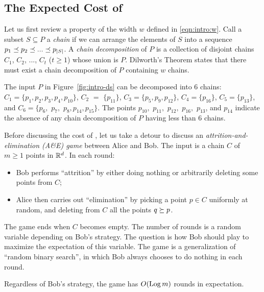 \subsection{The Expected Cost of } \label{sec:rpe:cost}

 Let us first review a property of the width $w$ defined in \eqref{eqn:intro:w}. Call a subset $S \subseteq P$ a {{\em chain}} if we can arrange the elements of $S$ into a sequence $p_1 \preceq p_2 \preceq  ... \preceq p_{|S|}$. A {{\em chain}} {{\em decomposition}} of $P$ is a collection of disjoint chains $C_1$, $C_2$, ..., $C_t$ ($t \ge 1$) whose union is $P$. Dilworth's Theorem \cite{d50} states that there must exist a chain decomposition of $P$ containing $w$ chains.

\vgap

    The input $P$ in Figure~\ref{fig:intro-ds} can be decomposed into 6 chains: $C_1 = \{p_1, p_2, p_3, p_4, p_{10}\}$, $C_2$ $=$ $\{p_{11}\}$, $C_3 = \{p_5, p_9, p_{12}\}$, $C_4 = \{p_{16}\}$, $C_5 = \{p_{13}\}$, and $C_6 = \{p_6,$ $p_7,$ $p_8, p_{14}, p_{15}\}$. The points $p_{10},$ $p_{11},$ $p_{12},$ $p_{16},$ $p_{13}$, and $p_{14}$ indicate the absence of any chain decomposition of $P$ having less than 6 chains.


 Before discussing the cost of , let us take a detour to discuss an {{\em attrition-and-elimination (A\&E) game}} between Alice and Bob. The input is a chain $C$ of $m \ge 1$ points in $\mathbb{R}^d$. In each round:
\begin{itemize}
    \item Bob performs ``attrition'' by either doing nothing or arbitrarily deleting some points from $C$;

    \item Alice then carries out ``elimination'' by picking a point $p \in C$ uniformly at random, and deleting from $C$ all the points $q \succeq p$.
\end{itemize}
The game ends when $C$ becomes empty. The number of rounds is a random variable depending on Bob's strategy. The question is how Bob should play to maximize the expectation of this variable. {The game is a generalization of ``random binary search'', in which Bob always chooses to do nothing in each round.}

\begin{lemma} \label{lmm:rpe:a-and-e}
    Regardless of Bob's strategy, the game has $O(\operatorname*{Log} m)$ rounds in expectation.
\end{lemma}

